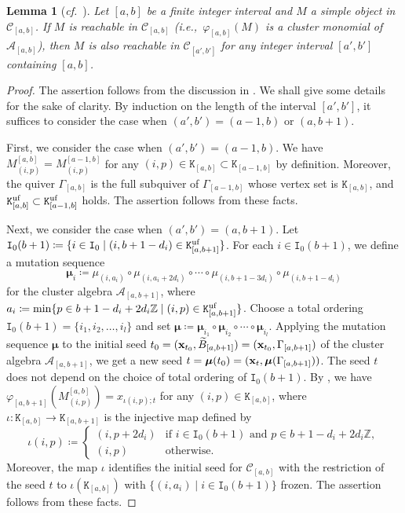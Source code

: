 \documentclass[12pt]{amsart}
\newtheorem{lemma}[theorem]{Lemma}
\theoremstyle{definition}
\theoremstyle{remark}
\numberwithin{equation}{section}
\newcommand{\ie}{\textit{i.e.,}\ }
\newcommand{\confer}{\textit{cf.}\ }
\begin{document}
\begin{lemma}[{\confer \cite{HL16}}]\label{lem:clust_ab}
Let $[a,b]$ be a finite integer interval and $M$ a simple object in $\mathcal C_{[a,b]}$. If $M$ is reachable in $\mathcal C_{[a,b]}$ (\ie $\varphi_{[a,b]}(M)$ is a cluster monomial of $\mathcal{A}_{[a,b]}$), then $M$ is also reachable in  $\mathcal C_{[a',b']}$ for any integer interval $[a',b']$ containing $[a,b]$. 
\end{lemma}
\begin{proof}
The assertion follows from the discussion in \cite[\S3]{HL16}. We shall give some details for the sake of clarity.  
By induction on the length of the interval $[a',b']$, it suffices to consider the case when $(a',b') = (a-1,b)$ or $(a,b+1)$. 

First, we consider the case when $(a',b') = (a-1,b)$. 
We have $M^{[a,b]}_{(i,p)} = M^{[a-1,b]}_{(i,p)}$ for any $(i,p) \in \mathtt{K}_{[a,b]} \subset \mathtt{K}_{[a-1,b]}$ by definition.
Moreover, the quiver $\Gamma_{[a,b]}$ is the full subquiver of $\Gamma_{[a-1,b]}$ whose vertex set is $\mathtt{K}_{[a,b]}$, and $\mathtt{K}^{\rm uf}_{[a,b]} \subset \mathtt{K}^{\rm uf}_{[a-1,b]}$ holds.
The assertion follows from these facts.

Next, we consider the case when $(a',b') = (a,b+1)$. Let $\mathtt{I}_0(b+1) \coloneqq \{i \in \mathtt{I}_0 \mid (i, b+1-d_i) \in \mathtt{K}_{[a,b+1]}^{\rm uf}\}$. For each $i \in \mathtt{I}_0(b+1)$, we define a mutation sequence 
\[ \boldsymbol{\mu}_{i} \coloneqq \mu_{(i,a_i)} \circ \mu_{(i,a_i + 2d_i)} \circ \cdots \circ \mu_{(i,b+1-3d_i)} \circ \mu_{(i,b+1-d_i)}\]
for the cluster algebra $\mathcal{A}_{[a,b+1]}$, where $a_i \coloneqq  \min\{p\in b+1-d_i + 2d_i\mathbb Z\mid (i,p)\in \mathtt K_{[a,b+1]}^{\rm uf}\}$. 
Choose a total ordering $\mathtt{I}_0(b+1) = \{ i_1, i_2, \ldots, i_l \}$ and set $\boldsymbol{\mu} \coloneqq  \boldsymbol{\mu}_{i_1}  \circ  \boldsymbol{\mu}_{i_2} \circ \cdots \circ \boldsymbol{\mu}_{i_l}$. Applying the mutation sequence $\boldsymbol{\mu}$ to the initial seed $t_0 = ({\bf x}_{t_0}, \widetilde B_{[a,b+1]})= ({\bf x}_{t_0}, \Gamma_{[a,b+1]})$ of the cluster algebra $\mathcal{A}_{[a,b+1]}$, we get a new seed $t = \boldsymbol{\mu}(t_0) = ({\bf x}_t, \boldsymbol{\mu}(\Gamma_{[a,b+1]}))$.
The seed $t$ does not depend on the choice of total ordering of $\mathtt{I}_0(b+1)$.
By \cite[\S3.2.3]{HL16}, we have $\varphi_{[a,b+1]}(M^{[a,b]}_{(i,p)}) = x_{\iota(i,p); t}$ for any $(i,p) \in \mathtt{K}_{[a,b]}$,
where $\iota \colon \mathtt{K}_{[a,b]} \to \mathtt{K}_{[a,b+1]}$ is the injective map defined by 
\[ \iota(i,p) \coloneqq \begin{cases}
(i,p+2d_i) & \text{if $i \in \mathtt{I}_0(b+1)$ and $p \in b+1-d_i + 2d_i\mathbb Z$}, \\
(i,p) & \text{otherwise}.
\end{cases} \]
Moreover, the map $\iota$ identifies the initial seed for $\mathcal{C}_{[a,b]}$ with the restriction of the seed $t$ to $\iota(\mathtt{K}_{[a,b]})$ with $\{(i,a_i) \mid i \in \mathtt{I}_0(b+1)\}$ frozen. 
The assertion follows from these facts.
\end{proof}
\end{document}
